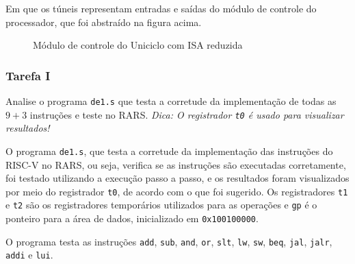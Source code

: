 \documentclass[a4paper,12pt]{article}
\newcommand{\cod}[1]{\texttt{#1}}
\begin{document}
\noindent Em que os túneis representam entradas e saídas do módulo de controle do processador, que foi abstraído na figura acima.

\begin{figure}[H]
    \centering
    
    \caption{Módulo de controle do Uniciclo com ISA reduzida}
\end{figure}

\subsubsection{Tarefa I}
\begin{tcolorbox}[title=Enunciado, colback=blue!5!white, colframe=blue!75!black]
Analise o programa \cod{de1.s} que testa a corretude da implementação de todas as $9 + 3$ instruções e
teste no RARS. \textit{Dica: O registrador \cod{t0} é usado para visualizar resultados!}
\end{tcolorbox}
O programa \cod{de1.s}, que testa a corretude da implementação das instruções do RISC-V no RARS, ou seja, verifica se as instruções são executadas corretamente, foi testado utilizando a execução passo a passo, e os resultados foram visualizados por meio do registrador \cod{t0}, de acordo com o que foi sugerido. Os registradores \cod{t1} e \cod{t2} são os registradores temporários utilizados para as operações e \cod{gp} é o ponteiro para a área de dados, inicializado em \cod{0x100100000}.

O programa testa as instruções \cod{add}, \cod{sub}, \cod{and}, \cod{or}, \cod{slt}, \cod{lw},
\cod{sw}, \cod{beq}, \cod{jal}, \cod{jalr}, \cod{addi} e \cod{lui}.
\end{document}
